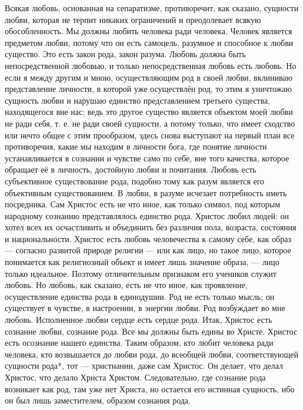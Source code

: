 \documentclass[12pt,oneside]{book}
\begin{document}
Всякая любовь, основанная на сепаратизме, противоречит, как сказано, сущности любви, которая не терпит никаких ограничений и преодолевает всякую обособленность. Мы должны любить человека ради человека. Человек является предметом любви, потому что он есть самоцель, разумное и способное к любви существо. Это есть закон рода, закон разума. Любовь должна быть непосредственной любовью, и только непосредственная любовь есть любовь. Но если я между другим и мною, осуществляющим род в своей любви, вклиниваю представление личности, в которой уже осуществлён род, то этим я уничтожаю сущность любви и нарушаю единство представлением третьего существа, находящегося вне нас; ведь это другое существо является объектом моей любви не ради себя, т. е. не ради своей сущности, а потому только, что имеет сходство или нечто общее с этим прообразом, здесь снова выступают на первый план все противоречия, какие мы находим в личности бога, где понятие личности устанавливается в сознании и чувстве само по себе, вне того качества, которое обращает её в личность, достойную любви и почитания. Любовь есть субъективное существование рода, подобно тому как разум является его объективным существованием. В любви, в разуме исчезает потребность иметь посредника. Сам Христос есть не что иное, как только символ, под которым народному сознанию представлялось единство рода. Христос любил людей: он хотел всех их осчастливить и объединить без различия пола, возраста, состояния и национальности. Христос есть любовь человечества к самому себе, как образ --- согласно развитой природе религии --- или как лицо, но такое лицо, которое понимается как религиозный объект и имеет лишь значение образа, --- лицо только идеальное. Поэтому отличительным признаком его учеников служит любовь. Но любовь, как сказано, есть не что иное, как проявление, осуществление единства рода в единодушии. Род не есть только мысль; он существует в чувстве, в настроении, в энергии любви. Род возбуждает во мне любовь. Исполненное любви сердце есть сердце рода. Итак, Христос есть сознание любви, сознание рода. Все мы должны быть едины во Христе. Христос есть осознание нашего единства. Таким образом, кто любит человека ради человека, кто возвышается до любви рода, до всеобщей любви, соответствующей сущности рода*\let\svthefootnote\thefootnote\let\thefootnote\relax{}\let\thefootnote\svthefootnote, тот --- христианин, даже сам Христос. Он делает, что делал Христос, что делало Христа Христом. Следовательно, где сознание рода возникает как род, там уже нет Христа, но остается его истинная сущность, ибо он был лишь заместителем, образом сознания рода.
\end{document}
